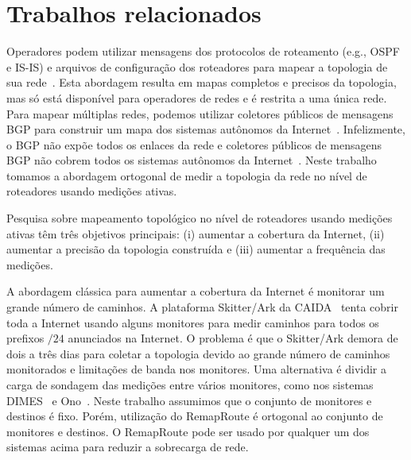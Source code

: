 \section{Trabalhos relacionados}
\label{sec:related}

Operadores podem utilizar mensagens dos protocolos de roteamento (e.g.,
OSPF e IS-IS) e arquivos de configuração dos roteadores para mapear a
topologia de sua rede~\cite{feamster05nsdi, turner10cenic,
athina08link}.  Esta abordagem resulta em mapas completos e precisos da
topologia, mas só está disponível para operadores de redes e é restrita
a uma única rede.  Para mapear múltiplas redes, podemos utilizar
coletores públicos de mensagens BGP\footnotemark{} para construir um
mapa dos sistemas autônomos da Internet~\cite{oliveira08as2tier,
dhamdhere08evo}.  Infelizmente, o BGP não expõe todos os enlaces da rede
e coletores públicos de mensagens BGP não cobrem todos os sistemas
autônomos da Internet~\cite{oliveira08as2tier, cohen06darkmatter}.
Neste trabalho tomamos a abordagem ortogonal de medir a topologia da
rede no nível de roteadores usando medições ativas.


Pesquisa sobre mapeamento topológico no nível de roteadores usando
medições ativas têm três objetivos principais: (i) aumentar a cobertura
da Internet, (ii) aumentar a precisão da topologia construída e (iii)
aumentar a frequência das medições.

A abordagem clássica para aumentar a cobertura da Internet é monitorar
um grande número de caminhos.  A plataforma Skitter/Ark da
CAIDA~\cite{skitter} tenta cobrir toda a Internet usando alguns
monitores para medir caminhos para todos os prefixos $/24$ anunciados na
Internet.  O problema é que o Skitter/Ark demora de dois a três dias
para coletar a topologia devido ao grande número de caminhos monitorados
e limitações de banda nos monitores.  Uma alternativa é dividir a carga
de sondagem das medições entre vários monitores, como nos sistemas
DIMES~\cite{shavitt09dimes} e Ono~\cite{choffnes10crowd}.  Neste
trabalho assumimos que o conjunto de monitores e destinos é fixo.
Porém, utilização do RemapRoute é ortogonal ao conjunto de monitores e
destinos.  O RemapRoute pode ser usado por qualquer um dos sistemas
acima para reduzir a sobrecarga de rede.

